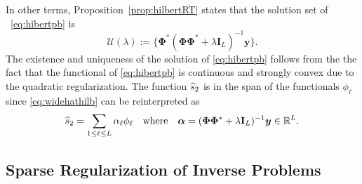 \documentclass[12pt]{article}
\begin{document}
    \noindent In other terms, Proposition~\ref{prop:hilbertRT} states that the solution set of ~\eqref{eq:hibertpb} is 
    \begin{equation}
        \mathcal{U} (\lambda) := \{ \bm{\Phi}^* ( \bm{\Phi} \bm{\Phi}^* + \lambda \mathbf{I}_L)^{-1} \bm{y}\}.
    \end{equation}
    The existence and uniqueness of the solution of \eqref{eq:hibertpb} follows from the the fact that the functional of \eqref{eq:hibertpb} is continuous and strongly convex due to the quadratic regularization.
    The function $ \widehat{s}_2 $ is in the span of the functionals $\phi_\ell$ since \eqref{eq:widehathilb} can be reinterpreted as 
    \begin{equation*}
    \widehat{s}_2  = \sum_{1 \leq \ell \leq L} \alpha_\ell \phi_\ell \quad \text{where} \quad \bm{\alpha} = ( \bm{\Phi} \bm{\Phi}^* + \lambda \mathbf{I}_L)^{-1} \bm{y} \in \mathbb{R}^L. 
    \end{equation*}

    
    
    \subsection{Sparse Regularization of Inverse Problems}
\end{document}
